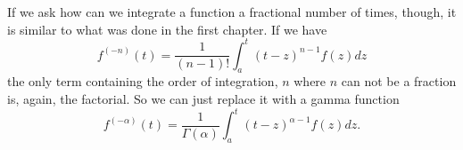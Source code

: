 If we ask how can we integrate a function a fractional number of times, though, it is similar to what was done in the first chapter. If we have
\begin{equation*}
  f^{(-n)}(t) = \frac{1}{\left( n - 1 \right)!} \int_a^t \left( t - z \right)^{n-1} f(z) dz
\end{equation*}
the only term containing the order of integration, $n$ where $n$ can not be a fraction is, again, the factorial. So we can just replace it with a gamma function 
\begin{equation}
  \boxed{ f^{(-\alpha)}(t) = \frac{1}{\Gamma \left( \alpha \right)} \int_a^t \left( t - z \right)^{\alpha-1} f(z) dz. }
  \label{eq:fracint}
\end{equation}
